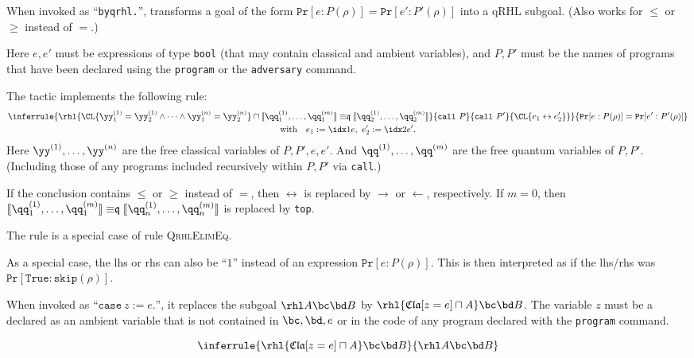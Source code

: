 \documentclass{article}
\renewcommand\ruleref[1]{rule \hbox{\textsc{#1}}}
\begin{document}
When invoked as ``\texttt{byqrhl.}'', transforms a goal of the form
$\mathtt{Pr}[e:P(\rho)] =\mathtt{Pr}[e':P'(\rho)]$
into a qRHL subgoal. (Also works for $\leq$ or $\geq$ instead of $=$.)

Here $e,e'$
must be expressions of type \texttt{bool} (that may contain classical and ambient variables),
and $P,P'$ must be the names of programs that have been declared using the
\texttt{program} or the \texttt{adversary} command.


The tactic implements the following rule:
\begin{multline*}
\inferrule{
  \pb\rhl{\CL{\yy^{(1)}_1=\yy^{(1)}_2\land\dots\land\yy^{(n)}_1=\yy^{(n)}_2}\sqcap
    \llbracket \qq_1^{(1)},\dots,\qq_1^{(m)} \rrbracket
    \mathrel{\mathord\equiv\mathfrak q}
    \llbracket \qq_2^{(1)},\dots,\qq_2^{(m)} \rrbracket}
  {\mathtt{call}\ P}{\mathtt{call}\ P'}
  {\CL{e_1\leftrightarrow e'_2}}
}
{
  \mathtt{Pr}[e:P(\rho)] =\mathtt{Pr}[e':P'(\rho)]
}
\\
\text{with}\quad e_1 := \idx1e,\ e'_2 := \idx2e'.
\end{multline*}
Here $\yy^{(1)},\dots,\yy^{(n)}$
are the free classical variables of $P,P',e,e'$.
And $\qq^{(1)},\dots,\qq^{(m)}$
are the free quantum variables of $P,P'$.
(Including those of any programs included recursively within $P,P'$
via \texttt{call}.)

If the conclusion contains $\leq$
or $\geq$
instead of $=$,
then $\leftrightarrow$
is replaced by $\rightarrow$
or $\leftarrow$,
respectively.  If $m=0$,
then
$\llbracket \qq_1^{(1)},\dots,\qq_1^{(m)} \rrbracket
\mathrel{\mathord\equiv\mathfrak q} \llbracket
\qq_n^{(1)},\dots,\qq_n^{(m)} \rrbracket$ is replaced by \texttt{top}.

The rule is a special case of \ruleref{QrhlElimEq}.


\bigskip

As a special case, the lhs or rhs can also be ``$1$'' instead of an
expression $\mathtt{Pr}[e:P(\rho)]$. This is then interpreted as if
the lhs/rhs was $\mathtt{Pr}[\mathtt{True}:\mathtt{skip}(\rho)]$.



When invoked as ``$\mathtt{case}\ z := e\mathtt{.}$'',
it replaces the subgoal $\rhl A\bc\bd B$
by $\rhl{\mathfrak{Cla}[z=e]\sqcap A}\bc\bd B$.
The variable $z$
must be a declared as an ambient variable that is not contained in
$\bc,\bd,e$
or in the code of any program declared with the \texttt{program} command.

\[
\inferrule
{\rhl{\mathfrak{Cla}[z=e]\sqcap A}\bc\bd B}
{\rhl A\bc\bd B}
\]
\end{document}
